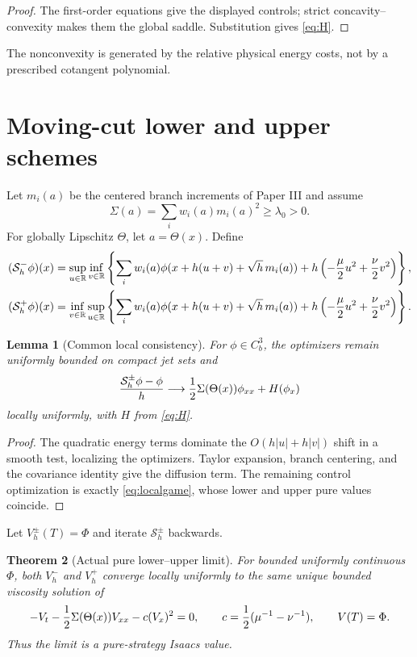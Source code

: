 \documentclass[11pt,reqno]{amsart}
\newtheorem{theorem}{Theorem}[section]
\newtheorem{lemma}[theorem]{Lemma}
\theoremstyle{definition}
\theoremstyle{remark}
\newcommand{\R}{\mathbb R}
\newcommand{\abs}[1]{\left\lvert #1\right\rvert}
\begin{document}
\begin{proof}
The first-order equations give the displayed controls; strict
concavity--convexity makes them the global saddle.  Substitution gives
\eqref{eq:H}.
\end{proof}

The nonconvexity is generated by the relative physical energy costs, not by a
prescribed cotangent polynomial.

\section{Moving-cut lower and upper schemes}\label{sec:schemes}
Let $m_i(a)$ be the centered branch increments of Paper III and assume
\[
 \Sigma(a)=\sum_iw_i(a)m_i(a)^2\ge\lambda_0>0.
\]
For globally Lipschitz $\Theta$, let $a=\Theta(x)$.  Define
\begin{align}
 (\mathcal S_h^-\phi)(x)&=
 \sup_{u\in\R}\inf_{v\in\R}\left\{
 \sum_iw_i(a)
 \phi(x+h(u+v)+\sqrt h\,m_i(a))
 +h\left(-{\mu\over2}u^2+{\nu\over2}v^2\right)
 \right\},\label{eq:lower}\\
 (\mathcal S_h^+\phi)(x)&=
 \inf_{v\in\R}\sup_{u\in\R}\left\{
 \sum_iw_i(a)
 \phi(x+h(u+v)+\sqrt h\,m_i(a))
 +h\left(-{\mu\over2}u^2+{\nu\over2}v^2\right)
 \right\}.
 \label{eq:upper}
\end{align}

\begin{lemma}[Common local consistency]\label{lem:consistency}
For $\phi\in C_b^3$, the optimizers remain uniformly bounded on compact jet
sets and
\[
 {\mathcal S_h^\pm\phi-\phi\over h}
 \longrightarrow {1\over2}\Sigma(\Theta(x))\phi_{xx}+H(\phi_x)
\]
locally uniformly, with $H$ from \eqref{eq:H}.
\end{lemma}

\begin{proof}
The quadratic energy terms dominate the $O(h\abs u+h\abs v)$ shift in a
smooth test, localizing the optimizers.  Taylor expansion, branch centering,
and the covariance identity give the diffusion term.  The remaining control
optimization is exactly \eqref{eq:localgame}, whose lower and upper pure values
coincide.
\end{proof}

Let $V_h^\pm(T)=\Phi$ and iterate $\mathcal S_h^\pm$ backwards.

\begin{theorem}[Actual pure lower--upper limit]\label{thm:scheme}
For bounded uniformly continuous $\Phi$, both $V_h^-$ and $V_h^+$ converge
locally uniformly to the same unique bounded viscosity solution of
\begin{equation}\label{eq:PDE}
 -V_t-{1\over2}\Sigma(\Theta(x))V_{xx}-c(V_x)^2=0,
 \qquad c={1\over2}(\mu^{-1}-\nu^{-1}),
 \qquad V(T)=\Phi.
\end{equation}
Thus the limit is a pure-strategy Isaacs value.
\end{theorem}
\end{document}
